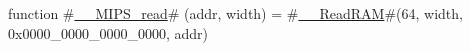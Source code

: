 function #\hyperref[zzyzyMIPSzyread]{\_\_MIPS\_read}# (addr, width) = #\hyperref[zzyzyReadRAM]{\_\_ReadRAM}#(64, width, 0x0000_0000_0000_0000, addr)
